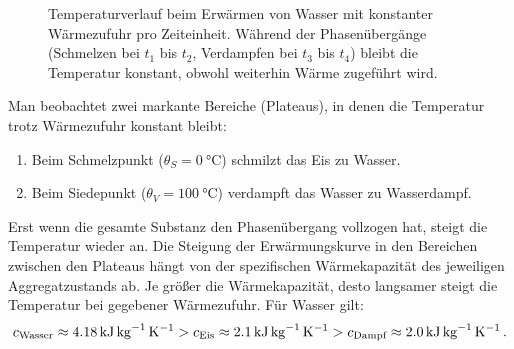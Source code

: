 \begin{figure}[htb]
    \caption{Temperaturverlauf beim Erwärmen von Wasser mit konstanter Wärmezufuhr pro Zeiteinheit. Während der Phasenübergänge (Schmelzen bei $t_1$ bis $t_2$, Verdampfen bei $t_3$ bis $t_4$) bleibt die Temperatur konstant, obwohl weiterhin Wärme zugeführt wird.}\label{fig: erwaermungskurve_wasser}
\end{figure}

Man beobachtet zwei markante Bereiche (Plateaus), in denen die Temperatur trotz Wärmezufuhr konstant bleibt:
\begin{enumerate}
    \item Beim Schmelzpunkt ($\theta_S = \SI{0}{\celsius}$) schmilzt das Eis zu Wasser.
    \item Beim Siedepunkt ($\theta_V = \SI{100}{\celsius}$) verdampft das Wasser zu Wasserdampf.
\end{enumerate}
Erst wenn die gesamte Substanz den Phasenübergang vollzogen hat, steigt die Temperatur wieder an. Die Steigung der Erwärmungskurve in den Bereichen zwischen den Plateaus hängt von der spezifischen Wärmekapazität des jeweiligen Aggregatzustands ab. Je größer die Wärmekapazität, desto langsamer steigt die Temperatur bei gegebener Wärmezufuhr. Für Wasser gilt:
\begin{equation}
    c_\text{Wasser} \approx \SI{4.18}{\kilo\joule\per\kilogram\per\kelvin} > c_\text{Eis} \approx \SI{2.1}{\kilo\joule\per\kilogram\per\kelvin} > c_\text{Dampf} \approx \SI{2.0}{\kilo\joule\per\kilogram\per\kelvin} \,.
\end{equation}

